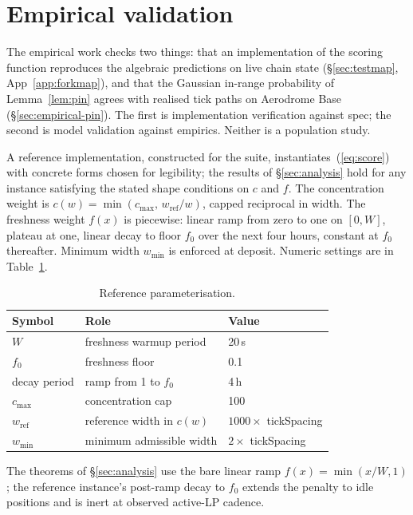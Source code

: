 \documentclass[11pt,a4paper]{article}
\theoremstyle{definition}
\theoremstyle{plain}
\theoremstyle{remark}
\begin{document}
\section{Empirical validation}\label{sec:empirical}

The empirical work checks two things: that an implementation of the scoring function reproduces the algebraic predictions on live chain state (\S\ref{sec:testmap}, App~\ref{app:forkmap}), and that the Gaussian in-range probability of Lemma~\ref{lem:pin} agrees with realised tick paths on Aerodrome Base (\S\ref{sec:empirical-pin}). The first is implementation verification against spec; the second is model validation against empirics. Neither is a population study.

A reference implementation, constructed for the suite, instantiates~(\ref{eq:score}) with concrete forms chosen for legibility; the results of \S\ref{sec:analysis} hold for any instance satisfying the stated shape conditions on $c$ and $f$. The concentration weight is $c(w) = \min(c_{\max},\, w_{\text{ref}}/w)$, capped reciprocal in width. The freshness weight $f(x)$ is piecewise: linear ramp from zero to one on $[0, W]$, plateau at one, linear decay to floor $f_0$ over the next four hours, constant at $f_0$ thereafter. Minimum width $w_{\min}$ is enforced at deposit. Numeric settings are in Table~\ref{tab:reference}.

\begin{table}[H]
\centering
\caption{Reference parameterisation.}
\label{tab:reference}
\small
\begin{tabular}{@{}lll@{}}
\toprule
Symbol & Role & Value \\
\midrule
$W$              & freshness warmup period      & 20\,s \\
$f_0$            & freshness floor              & 0.1 \\
decay period     & ramp from 1 to $f_0$         & 4\,h \\
$c_{\max}$       & concentration cap            & 100 \\
$w_{\text{ref}}$ & reference width in $c(w)$    & $1000 \times$ tickSpacing \\
$w_{\min}$       & minimum admissible width     & $2 \times$ tickSpacing \\
\bottomrule
\end{tabular}
\end{table}

The theorems of \S\ref{sec:analysis} use the bare linear ramp $f(x) = \min(x/W, 1)$; the reference instance's post-ramp decay to $f_0$ extends the penalty to idle positions and is inert at observed active-LP cadence.
\end{document}
